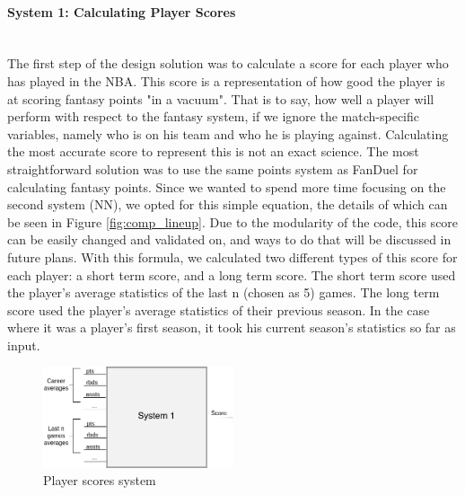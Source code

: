 \paragraph{System 1: Calculating Player Scores}\mbox{}\\
The first step of the design solution was to calculate a score for each player who has played in the NBA. This score is a representation of how good the player is at scoring fantasy points "in a vacuum". That is to say, how well a player will perform with respect to the fantasy system, if we ignore the match-specific variables, namely who is on his team and who he is playing against. Calculating the most accurate score to represent this is not an exact science. The most straightforward solution was to use the same points system as FanDuel for calculating fantasy points. Since we wanted to spend more time focusing on the second system (NN), we opted for this simple equation, the details of which can be seen in Figure \ref{fig:comp_lineup}. Due to the modularity of the code, this score can be easily changed and validated on, and ways to do that will be discussed in future plans. With this formula, we calculated two different types of this score for each player: a short term score, and a long term score. The short term score used the player's average statistics of the last n (chosen as 5) games. The long term score used the player's average statistics of their previous season. In the case where it was a player's first season, it took his current season's statistics so far as input.
\begin{figure}[ht]
    \centering
    \includegraphics[width=0.5\textwidth]{figures/player_scores}
    \caption{Player scores system}
    \label{fig:player_scores}
\end{figure}
